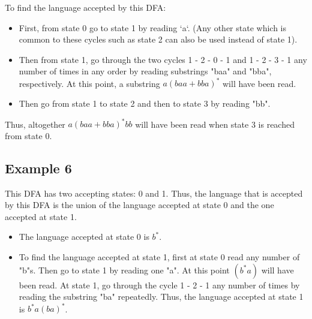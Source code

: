 \documentclass[12pt]{article}
\begin{document}
To find the language accepted by this DFA:
\begin{itemize}
    \item First, from state 0 go to state 1 by reading `a`. (Any other state which is common to these cycles such as state 2 can also be used instead of state 1).
    \item Then from state 1, go through the two cycles 1 - 2 - 0 - 1 and 1 - 2 - 3 - 1 any number of times in any order by reading substrings "baa" and "bba", respectively. At this point, a substring \( a(baa + bba)^* \) will have been read.
    \item Then go from state 1 to state 2 and then to state 3 by reading "bb".
\end{itemize}
Thus, altogether \( a(baa + bba)^*bb \) will have been read when state 3 is reached from state 0.
\newpage
\subsection*{Example 6}
\begin{center}
\end{center}
This DFA has two accepting states: 0 and 1. Thus, the language that is accepted by this DFA is the union of the language accepted at state 0 and the one accepted at state 1.
\begin{itemize}
    \item The language accepted at state 0 is \( b^* \).
    \item To find the language accepted at state 1, first at state 0 read any number of "b"s. Then go to state 1 by reading one "a". At this point \( (b^*a) \) will have been read. At state 1, go through the cycle 1 - 2 - 1 any number of times by reading the substring "ba" repeatedly. Thus, the language accepted at state 1 is \( b^*a(ba)^* \).
\end{itemize}
\end{document}
